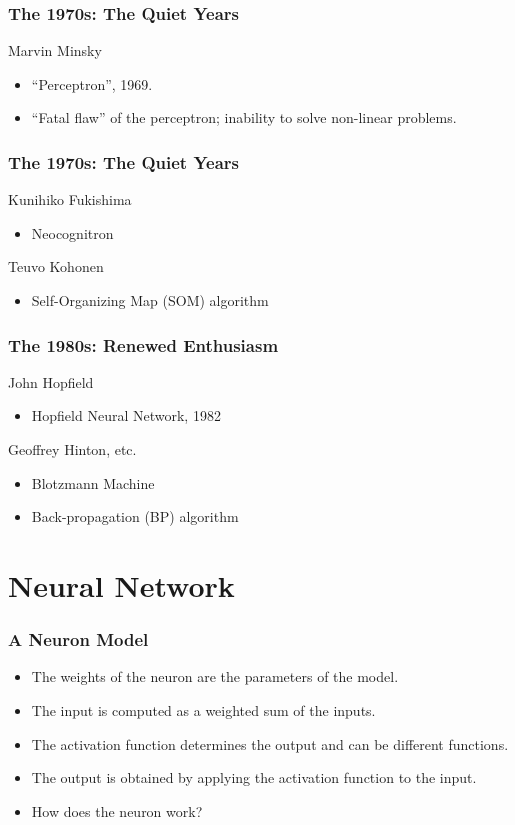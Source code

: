 \documentclass{beamer}
\begin{document}
\begin{frame}
	\frametitle{The 1970s: The Quiet Years}
	Marvin Minsky
	\begin{itemize}
		\item  “Perceptron”, 1969.
		\item “Fatal flaw” of the perceptron; inability to solve
		non-linear problems.
	\end{itemize}
\end{frame}

\begin{frame}
	\frametitle{The 1970s: The Quiet Years}
	Kunihiko Fukishima
	\begin{itemize}
		\item  Neocognitron
	\end{itemize}
	Teuvo Kohonen
	\begin{itemize}
		\item  Self-Organizing Map (SOM) algorithm
	\end{itemize}
\end{frame}

\begin{frame}
	\frametitle{The 1980s: Renewed Enthusiasm}
	John Hopfield
	\begin{itemize}
		\item  Hopfield Neural Network, 1982
	\end{itemize}
	Geoffrey Hinton, etc.
	\begin{itemize}
		\item  Blotzmann Machine
		\item Back-propagation (BP) algorithm
	\end{itemize}
\end{frame}

\section{Neural Network}
\begin{frame}
	\frametitle{A Neuron Model}
\begin{itemize}
	\item The weights of the neuron are the parameters of the model.
	\item The input is computed as a weighted sum of the inputs.
	\item The activation function determines the output and can be different functions.
	\item The output is obtained by applying the activation function to the input.
	\item How does the neuron work?
\end{itemize}
\end{frame}
\end{document}
